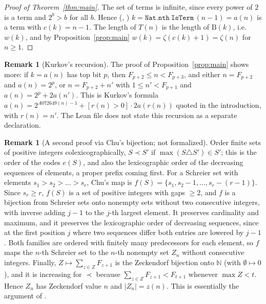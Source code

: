 \documentclass[11pt]{amsart}
\theoremstyle{plain}
\theoremstyle{definition}
\newtheorem{remark}[theorem]{Remark}
\newcommand{\N}{\mathbb{N}}
\newcommand{\Bits}{\mathrm{B}}
\begin{document}
\begin{proof}[Proof of Theorem~\ref{thm:main}]
The set of terms is infinite, since every power of $2$ is a term and $2^b>b$ for all $b$. Hence (, ) $k=\mathtt{Nat.nth\ IsTerm}\,(n-1)=a(n)$ is a term with $c(k)=n-1$. The length of $T(n)$ is the length of $\Bits(k)$, i.e.\ $w(k)$, and by Proposition~\ref{prop:main} $w(k)=\zeta(c(k)+1)=\zeta(n)$ for $n\ge1$.
\end{proof}

\begin{remark}[Kurkov's recursion]\label{rem:kurkov}
The proof of Proposition~\ref{prop:main} shows more: if $k=a(n)$ has top bit $p$, then $F_{p+2}\le n<F_{p+3}$, and either $n=F_{p+2}$ and $a(n)=2^p$, or $n=F_{p+2}+n'$ with $1\le n'<F_{p+1}$ and $a(n)=2^p+2a(n')$. This is Kurkov's formula $a(n)=2^{A072649(n)-1}+[r(n)>0]\cdot2a(r(n))$ quoted in the introduction, with $r(n)=n'$. The Lean file does not state this recursion as a separate declaration.
\end{remark}

\begin{remark}[A second proof via Chu's bijection; not formalized]\label{rem:chu}
Order finite sets of positive integers colexicographically, $S\prec S'$ if $\max(S\triangle S')\in S'$; this is the order of the codes $e(S)$, and also the lexicographic order of the decreasing sequences of elements, a proper prefix coming first. For a Schreier set with elements $s_1>s_2>\dots>s_r$, Chu's map \cite{Chu} is $f(S)=\{s_1,s_2-1,\dots,s_r-(r-1)\}$. Since $s_r\ge r$, $f(S)$ is a set of positive integers with gaps $\ge2$, and $f$ is a bijection from Schreier sets onto nonempty sets without two consecutive integers, with inverse adding $j-1$ to the $j$-th largest element. It preserves cardinality and maximum, and it preserves the lexicographic order of decreasing sequences, since at the first position $j$ where two sequences differ both entries are lowered by $j-1$. Both families are ordered with finitely many predecessors for each element, so $f$ maps the $n$-th Schreier set to the $n$-th nonempty set $Z_n$ without consecutive integers. Finally, $Z\mapsto\sum_{z\in Z}F_{z+1}$ is the Zeckendorf bijection onto $\N$ (with $\emptyset\mapsto0$), and it is increasing for $\prec$ because $\sum_{z\in Z}F_{z+1}<F_{t+1}$ whenever $\max Z<t$. Hence $Z_n$ has Zeckendorf value $n$ and $|Z_n|=z(n)$. This is essentially the argument of \cite{Issue}.
\end{remark}
\end{document}
